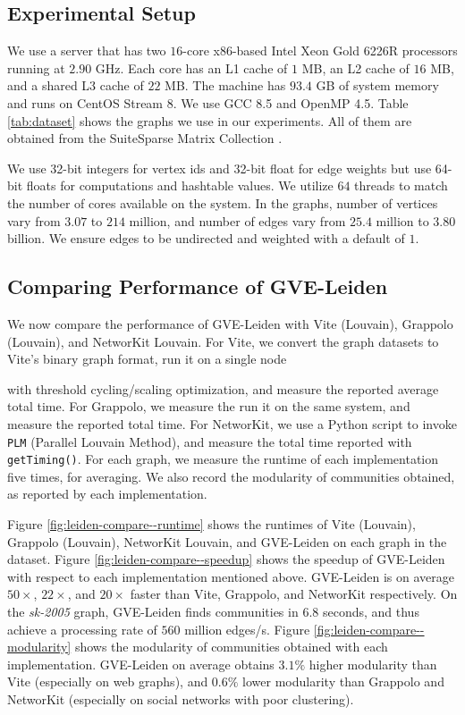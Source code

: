 \subsection{Experimental Setup}
\label{sec:setup}

We use a server that has two $16$-core x86-based Intel Xeon Gold 6226R processors running at $2.90$ GHz. Each core has an L1 cache of $1$ MB, an L2 cache of $16$ MB, and a shared L3 cache of $22$ MB. The machine has $93.4$ GB of system memory and runs on CentOS Stream 8. We use GCC 8.5 and OpenMP 4.5. Table \ref{tab:dataset} shows the graphs we use in our experiments. All of them are obtained from the SuiteSparse Matrix Collection \cite{suite19}.


We use 32-bit integers for vertex ids and 32-bit float for edge weights but use 64-bit floats for computations and hashtable values. We utilize $64$ threads to match the number of cores available on the system. In the graphs, number of vertices vary from $3.07$ to $214$ million, and number of edges vary from $25.4$ million to $3.80$ billion. We ensure edges to be undirected and weighted with a default of $1$.







\subsection{Comparing Performance of GVE-Leiden}

We now compare the performance of GVE-Leiden with Vite (Louvain), Grappolo (Louvain), and NetworKit Louvain. For Vite, we convert the graph datasets to Vite's binary graph format, run it on a single node with threshold cycling/scaling optimization, and measure the reported average total time. For Grappolo, we measure the run it on the same system, and measure the reported total time. For NetworKit, we use a Python script to invoke \texttt{PLM} (Parallel Louvain Method), and measure the total time reported with \texttt{getTiming()}. For each graph, we measure the runtime of each implementation five times, for averaging. We also record the modularity of communities obtained, as reported by each implementation.

Figure \ref{fig:leiden-compare--runtime} shows the runtimes of Vite (Louvain), Grappolo (Louvain), NetworKit Louvain, and GVE-Leiden on each graph in the dataset. Figure \ref{fig:leiden-compare--speedup} shows the speedup of GVE-Leiden with respect to each implementation mentioned above. GVE-Leiden is on average $50\times$, $22\times$, and $20\times$ faster than Vite, Grappolo, and NetworKit respectively. On the \textit{sk-2005} graph, GVE-Leiden finds communities in $6.8$ seconds, and thus achieve a processing rate of $560$ million edges/s. Figure \ref{fig:leiden-compare--modularity} shows the modularity of communities obtained with each implementation. GVE-Leiden on average obtains $3.1\%$ higher modularity than Vite (especially on web graphs), and $0.6\%$ lower modularity than Grappolo and NetworKit (especially on social networks with poor clustering).

